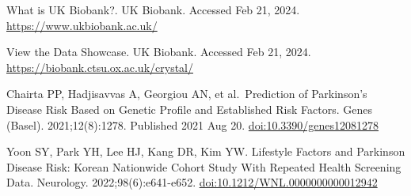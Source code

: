 \documentclass[12pt,]{article}
\begin{document}
What is UK Biobank?. UK Biobank. Accessed Feb 21, 2024.
\url{https://www.ukbiobank.ac.uk/}

View the Data Showcase. UK Biobank. Accessed Feb 21, 2024.
\url{https://biobank.ctsu.ox.ac.uk/crystal/}

Chairta PP, Hadjisavvas A, Georgiou AN, et al.~Prediction of Parkinson's
Disease Risk Based on Genetic Profile and Established Risk Factors.
Genes (Basel). 2021;12(8):1278. Published 2021 Aug 20.
\url{doi:10.3390/genes12081278}

Yoon SY, Park YH, Lee HJ, Kang DR, Kim YW. Lifestyle Factors and
Parkinson Disease Risk: Korean Nationwide Cohort Study With Repeated
Health Screening Data. Neurology. 2022;98(6):e641-e652.
\url{doi:10.1212/WNL.0000000000012942}


\end{document}
